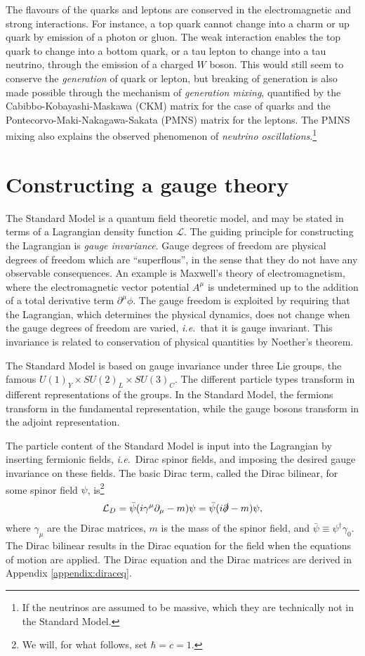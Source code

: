 \documentclass[twoside,english]{uiofysmaster}
\begin{document}
The flavours of the quarks and leptons are conserved in the electromagnetic and strong interactions. For instance, a top quark cannot change into a charm or up quark by emission of a photon or gluon. The weak interaction enables the top quark to change into a bottom quark, or a tau lepton to change into a tau neutrino, through the emission of a charged $W$ boson. This would still seem to conserve the {\it generation} of quark or lepton, but breaking of generation is also made possible through the mechanism of {\it generation mixing}, quantified by the Cabibbo-Kobayashi-Maskawa (CKM) matrix for the case of quarks and the Pontecorvo-Maki-Nakagawa-Sakata (PMNS) matrix for the leptons. The PMNS mixing also explains the observed phenomenon of {\it neutrino oscillations}.\footnote{If the neutrinos are assumed to be massive, which they are technically not in the Standard Model.}

\section{Constructing a gauge theory}

The Standard Model is a quantum field theoretic model, and may be stated in terms of a Lagrangian density function $\mathcal{L}$. The guiding principle for constructing the Lagrangian is {\it gauge invariance}. Gauge degrees of freedom are physical degrees of freedom which are ``superflous'', in the sense that they do not have any observable consequences. An example is Maxwell's theory of electromagnetism, where the electromagnetic vector potential $A^\mu$ is undetermined up to the addition of a total derivative term $\partial^\mu \phi$. The gauge freedom is exploited by requiring that the Lagrangian, which determines the physical dynamics, does not change when the gauge degrees of freedom are varied, {\it i.e.}\ that it is gauge invariant. This invariance is related to conservation of physical quantities by Noether's theorem.

The Standard Model is based on gauge invariance under three Lie groups, the famous $U(1)_Y\times SU(2)_L\times SU(3)_C$. The different particle types transform in different representations of the groups. In the Standard Model, the fermions transform in the fundamental representation, while the gauge bosons transform in the adjoint representation.

The particle content of the Standard Model is input into the Lagrangian by inserting fermionic fields, {\it i.e.}\ Dirac spinor fields, and imposing the desired gauge invariance on these fields. The basic Dirac term, called the Dirac bilinear, for some spinor field $\psi$, is\footnote{We will, for what follows, set $\hbar = c = 1$.} 
\begin{align}
	\mathcal{L}_D = \bar \psi (i\gamma^\mu \partial_\mu - m) \psi = \bar \psi (i\slashed\partial - m)\psi, \label{eq:diracbilinear}
\end{align}
where $\gamma_\mu$ are the Dirac matrices, $m$ is the mass of the spinor field, and $\bar\psi \equiv \psi^\dag \gamma_0$. The Dirac bilinear results in the Dirac equation for the field when the equations of motion are applied. The Dirac equation and the Dirac matrices are derived in Appendix \ref{appendix:diraceq}.
\end{document}
